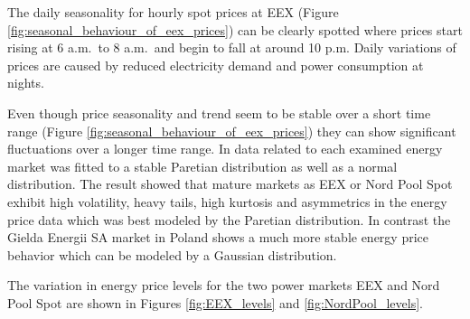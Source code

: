 The daily seasonality for hourly spot prices at EEX (Figure \ref{fig:seasonal_behaviour_of_eex_prices}) can be clearly spotted where prices 
start rising at 6 a.m.~to 8 a.m.~and begin to fall at around 10 p.m. Daily variations of prices are caused by reduced electricity demand and power consumption at nights. 

Even though price seasonality and trend seem to be stable over a short time range (Figure \ref{fig:seasonal_behaviour_of_eex_prices}) they can show significant fluctuations over a longer time range. In \cite{mugele2005stable} data related to each examined energy market was fitted to a stable Paretian distribution as well as a normal distribution. The result showed that mature markets as EEX or Nord Pool Spot exhibit high volatility, heavy tails, high kurtosis and asymmetrics in the energy price data which was best modeled by the Paretian distribution. In contrast the Gielda Energii SA market in Poland shows a much more stable energy price behavior which can be modeled by a Gaussian distribution. 

The variation in energy price levels for the two power markets EEX and Nord Pool Spot are shown in Figures \ref{fig:EEX_levels} and \ref{fig:NordPool_levels}.

